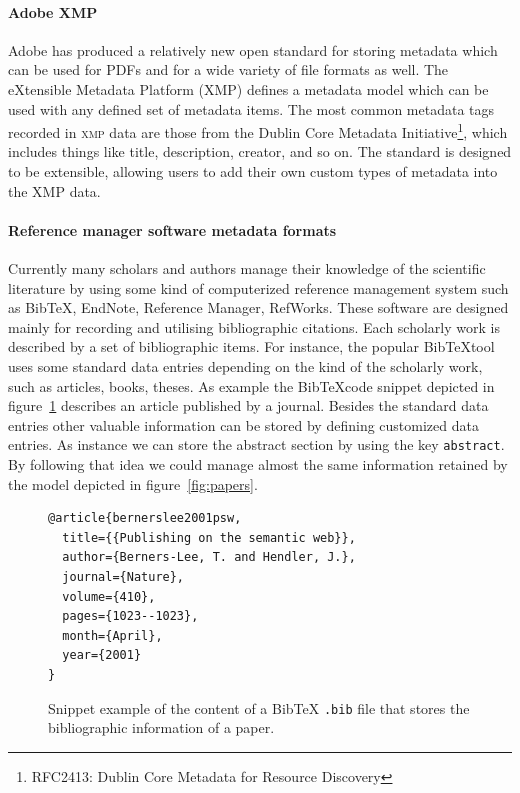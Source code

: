 \paragraph{Adobe XMP}Adobe has produced a relatively new open standard for storing metadata which can be used for \textsc{PDF}s and for a wide variety of file formats as well. The eXtensible Metadata Platform (XMP) defines a metadata model which can be used with any defined set of metadata items. The most common metadata tags recorded in \textsc{xmp} data are those from the Dublin Core Metadata Initiative\footnote{RFC2413: Dublin Core Metadata for Resource Discovery}, which includes things like title, description, creator, and so on. The standard is designed to be extensible, allowing users to add their own custom types of metadata into the XMP data.

\paragraph{Reference manager software metadata formats} Currently many scholars and authors manage their knowledge of the scientific literature by using some kind of computerized reference management system such as Bib\TeX, EndNote, Reference Manager, RefWorks. These software are designed mainly for recording and utilising bibliographic citations. Each scholarly work is described by a set of bibliographic items. For instance, the popular Bib\TeX tool uses some standard data entries depending on the kind of the scholarly work, such as articles, books, theses. As example the Bib\TeX code snippet depicted in figure~\ref{fig:bibtex_example} describes an article published by a journal. Besides the standard data entries other valuable information can be stored by defining customized data entries. As instance we can store the abstract section by using the key \texttt{abstract}. By following that idea we could manage almost the same information retained by the model depicted in figure~\ref{fig:papers}.

\begin{figure}
\centering
\begin{verbatim}
@article{bernerslee2001psw,
  title={{Publishing on the semantic web}},
  author={Berners-Lee, T. and Hendler, J.},
  journal={Nature},
  volume={410},
  pages={1023--1023},
  month={April},
  year={2001}
}\end{verbatim}
\caption{Snippet example of the content of a BibTeX \texttt{.bib} file that stores the bibliographic information of a paper.}\label{fig:bibtex_example}
\end{figure}

